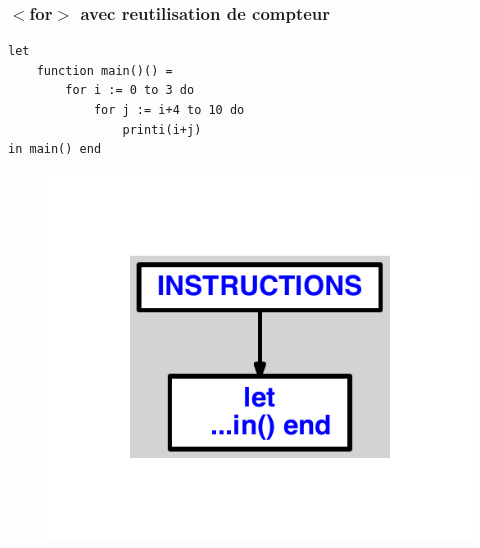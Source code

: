 \documentclass{article}
\begin{document}
\subsubsection{$ < $for$ > $ avec reutilisation de compteur}
\begin{lstlisting}
let
	function main()() =
		for i := 0 to 3 do
			for j := i+4 to 10 do
				printi(i+j)
in main() end
\end{lstlisting}
\newpage
\begin{figure}[H]
\centering
\includegraphics[max width=\textwidth]{ast/ast_211.pdf}
\end{figure}
\newpage
\end{document}
